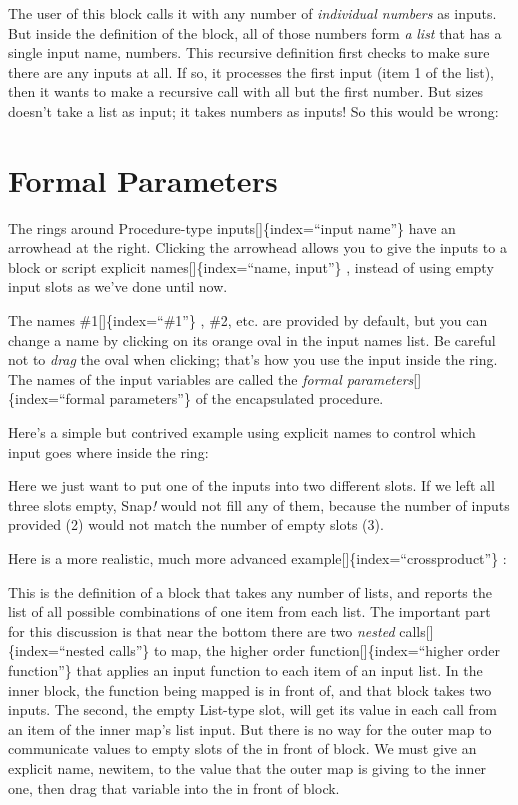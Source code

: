 \documentclass[
  letterpaper,
]{book}
\begin{document}
The user of this block calls it with any number of \emph{individual
numbers} as inputs. But inside the definition of the block, all of those
numbers form \emph{a} \emph{list} that has a single input name, numbers.
This recursive definition ﬁrst checks to make sure there are any inputs
at all. If so, it processes the ﬁrst input (item 1 of the list), then it
wants to make a recursive call with all but the ﬁrst number. But sizes
doesn't take a list as input; it takes numbers as inputs! So this would
be wrong:

\section{Formal Parameters}\label{formal-parameters}

The rings around Procedure-type inputs{[}{]}\{index=``input name''\}
have an arrowhead at the right. Clicking the arrowhead allows you to
give the inputs to a block or script explicit names{[}{]}\{index=``name,
input''\} , instead of using empty input slots as we've done until now.

The names \#1{[}{]}\{index=``\#1''\} , \#2, etc. are provided by
default, but you can change a name by clicking on its orange oval in the
input names list. Be careful not to \emph{drag} the oval when clicking;
that's how you use the input inside the ring. The names of the input
variables are called the \emph{formal parameters}{[}{]}\{index=``formal
parameters''\} of the encapsulated procedure.

Here's a simple but contrived example using explicit names to control
which input goes where inside the ring:

Here we just want to put one of the inputs into two different slots. If
we left all three slots empty, Snap\emph{!} would not fill any of them,
because the number of inputs provided (2) would not match the number of
empty slots (3).

Here is a more realistic, much more advanced
example{[}{]}\{index=``crossproduct''\} :

This is the definition of a block that takes any number of lists, and
reports the list of all possible combinations of one item from each
list. The important part for this discussion is that near the bottom
there are two \emph{nested} calls{[}{]}\{index=``nested calls''\} to
map, the higher order function{[}{]}\{index=``higher order function''\}
that applies an input function to each item of an input list. In the
inner block, the function being mapped is in front of, and that block
takes two inputs. The second, the empty List-type slot, will get its
value in each call from an item of the inner map's list input. But there
is no way for the outer map to communicate values to empty slots of the
in front of block. We must give an explicit name, newitem, to the value
that the outer map is giving to the inner one, then drag that variable
into the in front of block.
\end{document}
